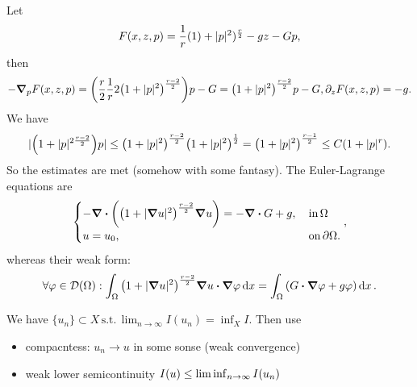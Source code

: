 \documentclass{article}
\begin{document}
\begin{example}
	Let
	\[
		F\qty(x,z,p) = \frac{1}{r}\qty(1)+|p|^{2})^{\frac{r}{2}} - gz - Gp,
	\]
	then
	\[
		- \grad_p F\qty(x,z,p) = \qty(\frac{r}{2}\frac{1}{r} 2 \qty(1+|p|^{2})^{\frac{r-2}{2}})p -G = \qty(1+|p|^{2})^{\frac{r-2}{2}}p-G, \partial_{z}F\qty(x,z,p) = -g.
	\]
	We have
	\[
		|\qty(1+|p|^{2\frac{r-2}{2}})p| \leq \qty(1+|p|^{2})^{\frac{r-2}{2}}\qty(1+|p|^{2})^{\frac{1}{2}} = \qty(1+|p|^{2})^{\frac{r-1}{2}}\leq C\qty(1+|p|^r).
	\]
	So the estimates are met (somehow with some fantasy).
	The Euler-Lagrange equations are
	\[
		\begin{cases}
			- \divergence{\qty(\qty(1+|\grad u|^{2})^{\frac{r-2}{2}}\grad u)} = - \divergence{G} + g, & \, \text{in} \, \Omega\\
			u = u_0, & \, \text{on} \, \partial \Omega.
		\end{cases},
	\]
	whereas their weak form:
	\[
		\forall \varphi \in \mathcal{D}\qty(\Omega):\int_{\Omega}\qty(1+|\grad u|^{2})^{\frac{r-2}{2}}\grad u \vdot \grad \varphi\dd{x} = \int_{\Omega}\qty(G \vdot \grad\varphi + g \varphi) \dd{x}.
	\]
\end{example}

\begin{remark}
	We have $\{u_n\}\subset X \, \text{s.t.} \, \lim_{n\to \infty} I(u_n) = \inf_X I.$ Then use
	\begin{itemize}
		\item compacntess: $u_n \to u$ in some sonse (weak convergence)
		\item weak lower semicontinuity $I(u) \leq \liminf_{n\to \infty}I\qty(u_n)$
	\end{itemize}
\end{remark}
\end{document}

